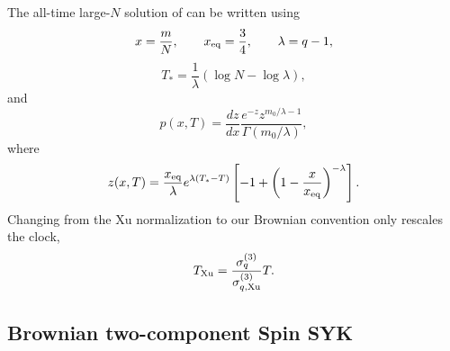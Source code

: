 \documentclass{article}
\theoremstyle{definition}
\begin{document}
The all-time large-$N$ solution of \cite{xu2025dynamics} can be written
using
\begin{equation}
    x=\frac mN,
    \qquad
    x_{\rm eq}=\frac34,
    \qquad
    \lambda=q-1,
\end{equation}
\begin{equation}
    T_*
    =\frac1\lambda(\log N-\log\lambda),
\end{equation}
and
\begin{equation}
    p(x,T)
    =\frac{dz}{dx}
      \frac{e^{-z}z^{m_0/\lambda-1}}
           {\Gamma(m_0/\lambda)},
\end{equation}
where
\begin{equation}
    z(x,T)
    =\frac{x_{\rm eq}}{\lambda}
     e^{\lambda(T_*-T)}
     \left[
       -1+\left(1-\frac{x}{x_{\rm eq}}\right)^{-\lambda}
     \right].
\end{equation}
Changing from the Xu normalization to our Brownian convention only rescales
the clock,
\begin{equation}
    T_{\rm Xu}
    =\frac{\sigma_q^{(3)}}{\sigma_{q,{\rm Xu}}^{(3)}}T.
\end{equation}

\subsection{Brownian two-component Spin SYK}
\end{document}
